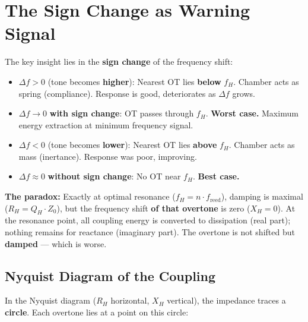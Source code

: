 \documentclass[11pt,a4paper]{article}
\begin{document}
\section{The Sign Change as Warning Signal}

The key insight lies in the \textbf{sign change} of the frequency shift:

\begin{itemize}[leftmargin=5mm, itemsep=4pt]
\item $\Delta f > 0$ (tone becomes \textbf{higher}): Nearest OT lies \textbf{below} $f_H$. Chamber acts as spring (compliance). Response is good, deteriorates as $\Delta f$ grows.
\item $\Delta f \to 0$ \textbf{with sign change}: OT passes through $f_H$. \textbf{Worst case.} Maximum energy extraction at minimum frequency signal.
\item $\Delta f < 0$ (tone becomes \textbf{lower}): Nearest OT lies \textbf{above} $f_H$. Chamber acts as mass (inertance). Response was poor, improving.
\item $\Delta f \approx 0$ \textbf{without sign change}: No OT near $f_H$. \textbf{Best case.}
\end{itemize}

\begin{warnbox}
\textbf{The paradox:} Exactly at optimal resonance ($f_H = n \cdot f_\text{reed}$), damping is maximal ($R_H = Q_H \cdot Z_0$), but the frequency shift \textbf{of that overtone} is zero ($X_H = 0$). At the resonance point, all coupling energy is converted to dissipation (real part); nothing remains for reactance (imaginary part). The overtone is not shifted but \textbf{damped} --- which is worse.
\end{warnbox}

\subsection{Nyquist Diagram of the Coupling}

In the Nyquist diagram ($R_H$ horizontal, $X_H$ vertical), the impedance traces a \textbf{circle}. Each overtone lies at a point on this circle:
\end{document}
